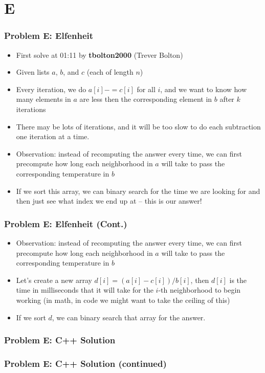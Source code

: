 \section{E}%
\label{sec:e}

\begin{frame}
  \frametitle{Problem E: Elfenheit}
  \begin{itemize}
    \item First solve at 01:11 by \textbf{tbolton2000} (Trever Bolton)
    \item Given lists $a$, $b$, and $c$ (each of length $n$)
    \item Every iteration, we do $a[i] -= c[i]$ for all $i$, and we want to know how many elements in $a$
      are less then the corresponding element in $b$ after $k$ iterations
    \item There may be lots of iterations, and it will be too slow to do each subtraction one
      iteration at a time.
    \item Observation: instead of recomputing the answer every time, we can first precompute how long each
      neighborhood in $a$ will take to pass the corresponding temperature in $b$
    \item If we sort this array, we can binary search for the time we are looking for and then just see
      what index we end up at -- this is our answer!
  \end{itemize}
\end{frame}

\begin{frame}
  \frametitle{Problem E: Elfenheit (Cont.)}
  \begin{itemize}
    \item Observation: instead of recomputing the answer every time, we can first precompute how long each
      neighborhood in $a$ will take to pass the corresponding temperature in $b$
    \item Let's create a new array $d[i] = (a[i] - c[i]) / b[i]$, then $d[i]$ is the time in
      milliseconds that it will take for the $i$-th neighborhood to begin working (in math, in code
      we might want to take the ceiling of this)
    \item If we sort $d$, we can binary search that array for the answer.
  \end{itemize}
\end{frame}

\begin{frame}
  \frametitle{Problem E: C++ Solution}
\end{frame}
\begin{frame}
  \frametitle{Problem E: C++ Solution (continued)}
\end{frame}
